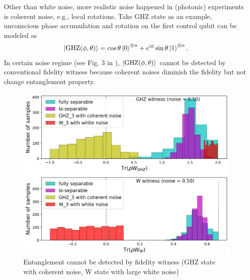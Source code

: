 \documentclass[
aps,
pra,
twocolumn,
floatfix,
]{revtex4-2}
\theoremstyle{plain}
\theoremstyle{definition}
\newcommand{\ghz}{\text{GHZ}}
\begin{document}
Other than white noise, more realistic noise happened in (photonic) experiments is coherent noise, e.g., local rotations.
Take GHZ state as an example, unconscious phase accumulation and 
rotation on the first control qubit can be modeled as 
\cite{zhouEntanglementDetectionCoherent2020}
\begin{equation}
	\ket{\ghz(\phi,\theta)}=
	\cos\theta\ket{0}^{\otimes n}+e^{\ii \phi}\sin\theta\ket{1}^{\otimes n}.
	\label{eq:coherent_noise}
\end{equation}
In certain noise regime (see Fig. 3 in \cite{zhouEntanglementDetectionCoherent2020}), $\ket{\ghz(\phi,\theta)}$ cannot be detected by conventional fidelity witness because coherent noises diminish the fidelity but not change entanglement property.
\begin{figure}[!ht]
	\centering
	\includegraphics[width=.95\linewidth]{./Code/fidelity_witness_compare_2_long.png}
	\caption{Entanglement cannot be detected by fidelity witness (GHZ state with coherent noise, W state with large white noise)}
\end{figure}
\end{document}
